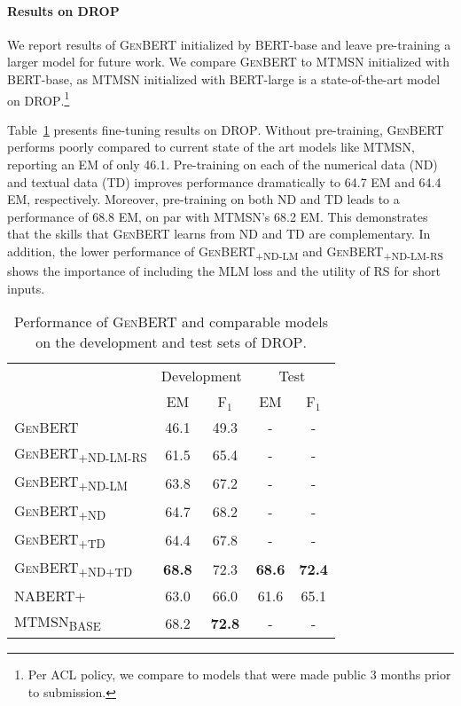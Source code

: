 \documentclass[11pt,a4paper]{article}
\newcommand\ssc[1]{\textsubscript{\textsc{#1}}}
\newcommand\bert{\textsc{BERT}}
\newcommand\genbert{\textsc{GenBERT}}
\newcommand\nabert{\textsc{NABERT+}}
\newcommand\mtmsn{\textsc{MTMSN}}
\newcommand\drop{\textsc{DROP}}
\begin{document}
\paragraph{Results on \drop{}}
We report results of \genbert{} initialized by \bert{}-base and leave pre-training a larger model 
for future work. We compare \genbert{} to 
\mtmsn{} \cite{hu2019multi} initialized with \bert{}-base, as \mtmsn{} initialized with \bert{}-large is a state-of-the-art model on \drop{}.\footnote{Per ACL policy, we compare to models that were made public 3 months prior to submission.}

Table~\ref{table:drop_performance} presents fine-tuning results on \drop{}. 
Without pre-training, \genbert{} performs poorly compared to current state of the art models like \mtmsn, reporting an EM of only 46.1. Pre-training on each of the numerical data (ND) and textual data (TD) improves performance dramatically to 64.7 EM and 64.4 EM, respectively. Moreover, pre-training on both ND and TD leads to a performance of 68.8 EM, on par with MTMSN's 68.2 EM. This demonstrates that the skills that \genbert{} learns from ND and TD are complementary.
In addition, the lower performance of \textsc{GenBERT\ssc{+ND-LM}} and \textsc{GenBERT\ssc{+ND-LM-RS}} shows the importance of including the MLM loss and the utility of RS for short inputs.

\begin{table}[t]\setlength{\belowcaptionskip}{-5pt}
    \footnotesize
    \centering
    \begin{tabular}{l|c|c|c|c|}
         & \multicolumn{2}{c|}{Development} & \multicolumn{2}{c|}{Test} \\ 
         & EM & F$_1$ & EM & F$_1$ \\ \hline
         \textsc{GenBERT} & 46.1 & 49.3 & - & -\\
         \textsc{GenBERT\ssc{+ND-LM-RS}} & 61.5 & 65.4 & - & -\\
         \textsc{GenBERT\ssc{+ND-LM}} & 63.8 & 67.2 & -& -\\
         \textsc{GenBERT\ssc{+ND}} & 64.7 & 68.2 & -& -\\
         \textsc{GenBERT\ssc{+TD}} & 64.4 & 67.8 & -& -\\
         \textsc{GenBERT\ssc{+ND+TD}} & \textbf{68.8} & 72.3 & \textbf{68.6} & \textbf{72.4} \\
\hline\hline
         \nabert & 63.0 & 66.0 & 61.6 & 65.1 \\
         \mtmsn \textsubscript{\textsc{BASE}} & 68.2 & \textbf{72.8} & -& -\\
\end{tabular}
    \caption{Performance of \genbert{} and comparable models on the development and test sets of \drop{}.}
\label{table:drop_performance}
\end{table}
\end{document}
